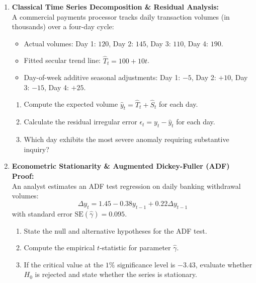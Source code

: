 \begin{enumerate}[label=\textbf{P10.\arabic*}]
    \item \textbf{Classical Time Series Decomposition \& Residual Analysis:}\\
    A commercial payments processor tracks daily transaction volumes (in thousands) over a four-day cycle:
    \begin{itemize}
        \item Actual volumes: Day 1: $120$, Day 2: $145$, Day 3: $110$, Day 4: $190$.
        \item Fitted secular trend line: $\hat{T}_t = 100 + 10 t$.
        \item Day-of-week additive seasonal adjustments: Day 1: $-5$, Day 2: $+10$, Day 3: $-15$, Day 4: $+25$.
    \end{itemize}
    \begin{enumerate}[label=(\alph*)]
        \item Compute the expected volume $\hat{y}_t = \hat{T}_t + \hat{S}_t$ for each day.
        \item Calculate the residual irregular error $\epsilon_t = y_t - \hat{y}_t$ for each day.
        \item Which day exhibits the most severe anomaly requiring substantive inquiry?
    \end{enumerate}

    \item \textbf{Econometric Stationarity \& Augmented Dickey-Fuller (ADF) Proof:}\\
    An analyst estimates an ADF test regression on daily banking withdrawal volumes:
    \begin{equation*}
    \Delta y_t = 1.45 - 0.38 y_{t-1} + 0.22 \Delta y_{t-1}
    \end{equation*}
    with standard error $\text{SE}(\hat{\gamma}) = 0.095$.
    \begin{enumerate}[label=(\alph*)]
        \item State the null and alternative hypotheses for the ADF test.
        \item Compute the empirical $t$-statistic for parameter $\hat{\gamma}$.
        \item If the critical value at the $1\%$ significance level is $-3.43$, evaluate whether $H_0$ is rejected and state whether the series is stationary.
    \end{enumerate}


\end{enumerate}
